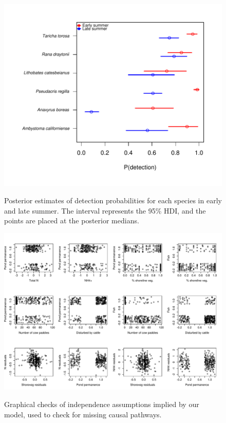 \begin{figure}[htbp]
\caption[Detection parameter estimates]{
Posterior estimates of detection probabilities for each species in early
and late summer. The interval represents the 95\% HDI, and the points
are placed at the posterior medians.
}
\centering
\includegraphics[width=150mm]{figs/ch3/fig_s4.pdf}
\label{3-a4}
\end{figure}

\begin{figure}[htbp]
\caption[Graphical independence checks]{
Graphical checks of independence assumptions implied by our model, used
to check for missing causal pathways.
}
\centering
\includegraphics[width=150mm]{figs/ch3/fig_s5.pdf}
\label{3-a5}
\end{figure}
